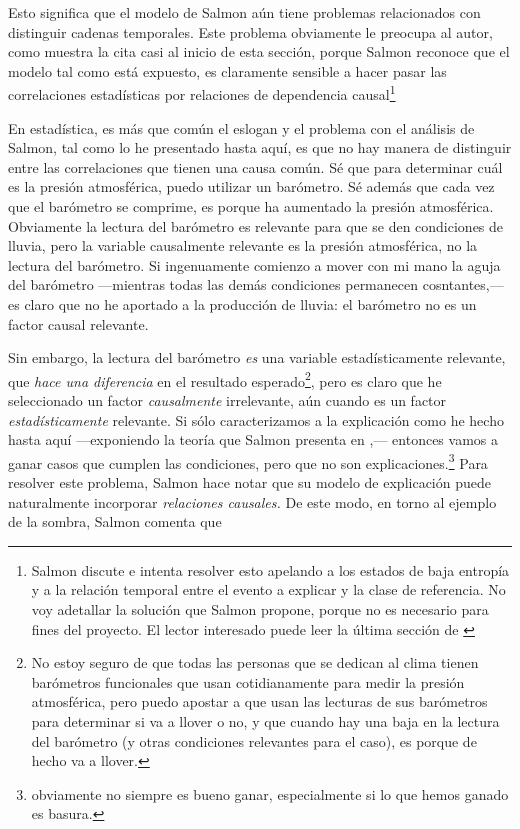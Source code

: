 Esto significa que el modelo de Salmon aún tiene problemas relacionados
con distinguir cadenas temporales. Este problema obviamente le preocupa al
autor, como muestra la cita casi al inicio de esta sección, porque Salmon
reconoce que el modelo tal como está expuesto, es claramente sensible a
hacer pasar las correlaciones estadísticas por relaciones de dependencia
causal\footnote{
	Salmon discute e intenta resolver esto apelando a los estados de baja
	entropía y a la relación temporal entre el evento a explicar y la
	clase de referencia. No voy adetallar la solución que Salmon propone,
	porque no es necesario para fines del proyecto. El lector interesado
	puede leer la última sección de \parencite{Salmon1970}
}

En estadística, es más que común el eslogan  y el problema con el análisis de Salmon, tal como lo he
presentado hasta aquí,  es que no hay manera de distinguir entre las
correlaciones que tienen una causa común. Sé que para determinar cuál es
la presión atmosférica, puedo utilizar un barómetro. Sé además que cada
vez que el barómetro se comprime, es porque ha aumentado la presión
atmosférica. Obviamente la lectura del barómetro es relevante para que se
den condiciones de lluvia, pero la variable causalmente relevante es la
presión atmosférica, no la lectura del barómetro. Si ingenuamente comienzo
a mover con mi mano la aguja del barómetro ---mientras todas las demás
condiciones permanecen cosntantes,--- es claro que no he aportado a la
producción de lluvia: el barómetro no es un factor causal relevante.

Sin embargo, la lectura del barómetro \emph{es} una variable
estadísticamente relevante, que \emph{hace una diferencia} en el resultado
esperado\footnote{
	No estoy seguro de que todas las
	personas que se dedican al clima tienen barómetros funcionales que
	usan cotidianamente para medir la presión atmosférica, pero puedo
	apostar a que usan las lecturas de sus barómetros para determinar si
	va a llover o no, y que cuando hay una baja en la lectura del
	barómetro (y otras condiciones relevantes para el caso), es porque de
	hecho va a llover.
},
pero es claro que he seleccionado un factor \emph{causalmente}
irrelevante, aún cuando es un factor \emph{estadísticamente} relevante. Si
sólo caracterizamos a la explicación como he hecho hasta aquí
---exponiendo la teoría que Salmon presenta en \parencite{Salmon1970},---
entonces vamos a ganar casos que cumplen las condiciones, pero que no son
explicaciones.\footnote{
	obviamente no siempre es bueno ganar, especialmente si lo que hemos
	ganado es basura.
}
Para resolver este problema, Salmon hace notar que su modelo de
explicación puede naturalmente incorporar \emph{relaciones causales.} De este modo, en torno al ejemplo de la sombra, Salmon comenta que

